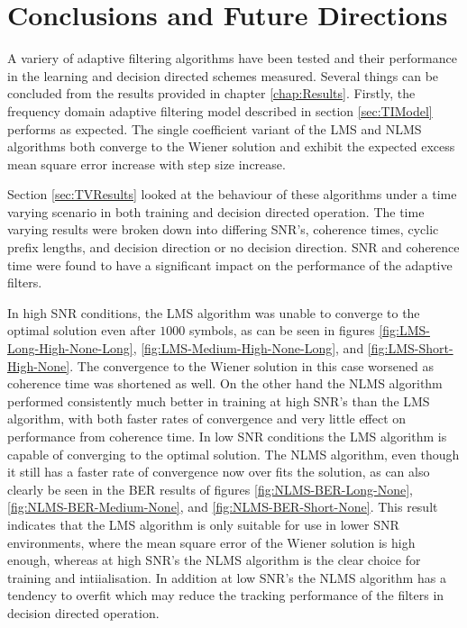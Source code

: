 \chapter{Conclusions and Future Directions}
\label{chap:Conclusion}

A variery of adaptive filtering algorithms have been tested %
and their performance in the learning and decision directed %
schemes measured. Several things can be concluded from %
the results provided in chapter \ref{chap:Results}. Firstly, %
the frequency domain adaptive filtering model described in %
section \ref{sec:TIModel} performs as expected. The single coefficient %
variant of the LMS and NLMS algorithms both converge to %
the Wiener solution and exhibit the expected excess %
mean square error increase with step size increase.

Section \ref{sec:TVResults} looked at the behaviour %
of these algorithms under a time varying scenario in %
both training and decision directed operation. The %
time varying results were broken down into %
differing SNR's, coherence times, cyclic prefix lengths, %
and decision direction or no decision direction. SNR and %
coherence time were found to have a significant impact %
on the performance of the adaptive filters.

In high SNR conditions, the LMS algorithm was unable %
to converge to the optimal solution even after $1000$ %
symbols, as can be seen in figures \ref{fig:LMS-Long-High-None-Long}, %
\ref{fig:LMS-Medium-High-None-Long}, and %
\ref{fig:LMS-Short-High-None}. The convergence to the %
Wiener solution in this case worsened as coherence %
time was shortened as well. On the other hand the NLMS algorithm %
performed consistently much better in training at high SNR's %
than the LMS algorithm, with both faster rates of convergence and %
very little effect on performance from coherence time. In low %
SNR conditions the LMS algorithm is capable of converging %
to the optimal solution. The NLMS algorithm, even though it %
still has a faster rate of convergence now over fits the solution, %
as can also clearly be seen in the BER results of figures %
\ref{fig:NLMS-BER-Long-None}, \ref{fig:NLMS-BER-Medium-None}, 
and \ref{fig:NLMS-BER-Short-None}. This result %
indicates that the LMS algorithm is only suitable for use in %
lower SNR environments, where the mean square error %
of the Wiener solution is high enough, whereas at high %
SNR's the NLMS algorithm is the clear choice for training and %
intiialisation. In addition at low SNR's the NLMS algorithm %
has a tendency to overfit which may reduce the tracking %
performance of the filters in decision directed operation.

